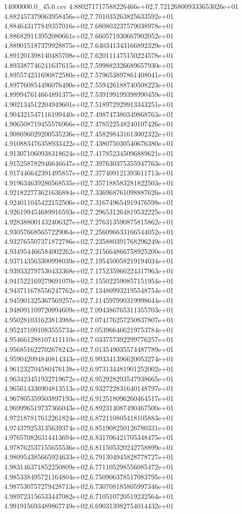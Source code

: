 \begin{filecontents*}{14000000.0_45.0.csv}
4.880271717588226466e+02,7.721268009333653026e+01
4.882457379063958456e+02,7.701035263825633592e+01
4.884643177849357016e+02,7.680803237579038978e+01
4.886829113952080661e+02,7.660571930667902052e+01
4.889015187379928875e+02,7.640341343166892329e+01
4.891201398140485708e+02,7.620111475150224578e+01
4.893387746241637615e+02,7.599882326689657930e+01
4.895574231690872580e+02,7.579653897861408041e+01
4.897760854496076490e+02,7.559426188740508223e+01
4.899947614664891375e+02,7.539199199398990459e+01
4.902134512204949601e+02,7.518972929913343251e+01
4.904321547116199440e+02,7.498747380349868763e+01
4.906508719455576966e+02,7.478522548240107426e+01
4.908696029200535236e+02,7.458298431613002322e+01
4.910883476358933422e+02,7.438075030540676380e+01
4.913071060938318624e+02,7.417852345096889621e+01
4.915258782946646647e+02,7.397630375355947763e+01
4.917446642391495857e+02,7.377409121393611713e+01
4.919634639280568535e+02,7.357188583281822503e+01
4.921822773621636884e+02,7.336968761098887626e+01
4.924011045422152506e+02,7.316749654919476598e+01
4.926199454689916593e+02,7.296531264819532225e+01
4.928388001432406327e+02,7.276313590875815862e+01
4.930576685657229064e+02,7.256096633166544052e+01
4.932765507371872786e+02,7.235880391768296249e+01
4.934954466584002262e+02,7.215664866758925200e+01
4.937143563300998039e+02,7.195450058219194034e+01
4.939332797530433368e+02,7.175235966224317963e+01
4.941522169279691070e+02,7.155022590857151954e+01
4.943711678556247762e+02,7.134809932195548754e+01
4.945901325367569257e+02,7.114597990319998644e+01
4.948091109720994609e+02,7.094386765311355703e+01
4.950281031623813988e+02,7.074176257250837807e+01
4.952471091083555734e+02,7.053966466219753784e+01
4.954661288107411110e+02,7.033757392299776257e+01
4.956851622702678242e+02,7.013549035574487789e+01
4.959042094840814343e+02,6.993341396620053274e+01
4.961232704580476138e+02,6.973134481901252002e+01
4.963423451932719672e+02,6.952928293547938665e+01
4.965614336904813513e+02,6.932722831640148797e+01
4.967805359503897193e+02,6.912518096260464517e+01
4.969996519737366043e+02,6.892314087490467500e+01
4.972187817612261824e+02,6.872110805418105883e+01
4.974379253135639374e+02,6.851908250126780331e+01
4.976570826314413694e+02,6.831706421705348475e+01
4.978762537155655536e+02,6.811505320242758899e+01
4.980954385665924633e+02,6.791304945828778727e+01
4.983146371852250809e+02,6.771105298556085472e+01
4.985338495721164804e+02,6.750906378517083795e+01
4.987530757279428713e+02,6.730708185805997346e+01
4.989723156533447082e+02,6.710510720519232564e+01
4.991915693489867749e+02,6.690313982754014432e+01

\end{filecontents*}
